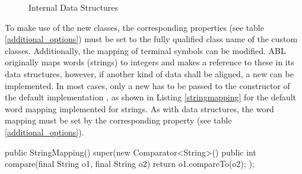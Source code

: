 \documentclass[12pt,a4paper]{article}
\newcommand{\code}[1]{{\ttfamily\selectfont{#1}}}
\begin{document}
\begin{figure}
  \centering
  \caption{Internal Data Structures}
  \label{data_img} 
\end{figure} 

To make use of the new classes, the corresponding properties (see table
\ref{additional_options}) must be set to the fully qualified class name of the
custom classes. Additionally, the mapping of terminal symbols can be modified.
ABL originally maps words (strings) to integers and makes a reference to these in
its data structures, however, if another kind of data shall be aligned, a new
\code{IWordMapping} can be implemented. In most cases, only a new
\code{java.util.Comparator} has to be passed to the constructor of the default
implementation \code{WordMapping}, as shown in Listing \ref{stringmapping} for
the default word mapping implemented for strings. As with data structures, the
word mapping must be set by the corresponding property (see table
\ref{additional_options}).

\begin{java} [caption={Constructor of class StringMapping},label={stringmapping}] 
	public StringMapping() { 
		super(new Comparator<String>() {
			public int compare(final String o1, final String o2) {
				return o1.compareTo(o2);
			}
		});
	}
\end{java}
\end{document}
